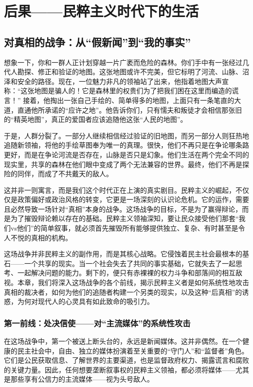 \part{后果——民粹主义时代下的生活}

\chapter{对真相的战争：从“假新闻”到“我的事实”}
想象一下，你和一群人正计划穿越一片广袤而危险的森林。你们手中有一张经过几代人勘探、修正和验证的地图。这张地图或许不完美，但它标明了河流、山脉、沼泽和安全的路径。现在，一位魅力非凡的领袖站了出来，他指着地图大声宣称：“这张地图是骗人的！它是森林里的权贵们为了把我们困在这里而编造的谎言！” 接着，他掏出一张自己手绘的、简单得多的地图，上面只有一条笔直的大道，直通他所承诺的“应许之地”。他告诉你们，只有懦夫和叛徒才会相信那张旧的“精英地图”，真正的爱国者应该追随他这张“人民的地图”。

于是，人群分裂了。一部分人继续相信经过验证的旧地图，而另一部分人则狂热地追随新领袖，将他的手绘草图奉为唯一的真理。很快，他们不再只是在争论哪条路更好，而是在争论河流是否存在，山脉是否只是幻象。他们生活在两个完全不同的现实里，共享的森林在他们眼中变成了两个无法兼容的世界。最终，他们不再是探险的同伴，而成了不共戴天的敌人。

这并非一则寓言，而是我们这个时代正在上演的真实剧目。民粹主义的崛起，不仅仅是政策偏好或政治风格的转变，它更是一场深刻的认识论危机。它的运作，需要且必然导致一场针对“真相”本身的战争。这场战争的目标，不是为了赢得辩论，而是为了摧毁辩论赖以存在的基础。民粹主义领袖深知，要让民众接受他们那套“我们vs他们”的简单叙事，就必须首先摧毁所有能够提供独立、复杂、有时甚至是令人不悦的真相的机构。

这场战争并非民粹主义的副作用，而是其核心战略。它侵蚀着民主社会最根本的基石——一个共享的现实。当一个社会失去了共同的事实基础，它就失去了一起思考、一起解决问题的能力。剩下的，便只有赤裸裸的权力斗争和部落间的相互敌视。本章，我们将深入这场战争的各个前线，揭示民粹主义者是如何系统性地攻击真相的裁决者，如何为他们的追随者构建一个另类的现实，以及这种“后真相”的诱惑，为何对现代人的心灵具有如此致命的吸引力。

\section{第一前线：处决信使——对“主流媒体”的系统性攻击}
在这场战争中，第一个被送上断头台的，永远是新闻媒体。这并非偶然。在一个健康的民主社会中，自由、独立的媒体扮演着至关重要的“守门人”和“监督者”角色。它们是公民获取信息、了解世界的主要渠道，也是监督政府权力、揭露谎言和腐败的关键力量。因此，任何想要垄断叙事权的民粹主义领袖，都必须将媒体——尤其是那些享有公信力的主流媒体——视为头号敌人。

